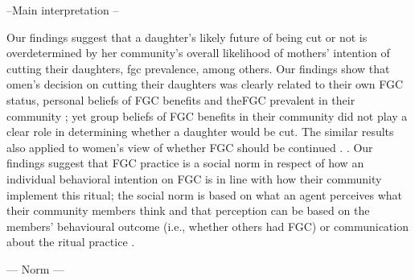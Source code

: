 \documentclass[12pt,]{article}
\begin{document}
--Main interpretation --

Our findings suggest that a daughter’s likely future of being cut or not is overdetermined by her community’s overall likelihood of mothers’ intention of cutting their daughters, fgc prevalence, among others.  Our findings show that omen’s decision on cutting their daughters was clearly related to their own FGC status, personal beliefs of FGC benefits and theFGC prevalent in their community ; yet group beliefs of FGC benefits in their community did not play a clear role in determining whether a daughter would be cut.  The similar results also applied to women’s view of whether FGC should be continued .  .  Our findings suggest that FGC practice is a social norm in respect of how an individual behavioral intention on FGC is in line with how their community implement this ritual; the social norm is based on what an agent perceives what their community members think and that perception can be based on the members’ behavioural outcome (i.e., whether others had FGC) or communication about the ritual practice \cite{} .
 


— Norm —
\end{document}
